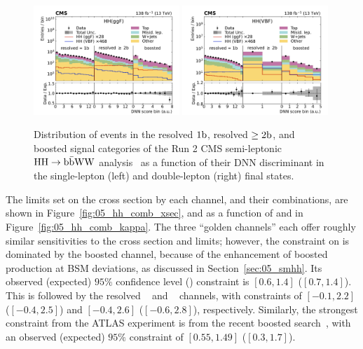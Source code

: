 \begin{figure}[htb!]
    \centering
    \includegraphics[width=0.49\textwidth]{figures/05-HH/CMS-results/bbww/CMS-HIG-21-005_Figure_005-a.pdf}
    \includegraphics[width=0.49\textwidth]{figures/05-HH/CMS-results/bbww/CMS-HIG-21-005_Figure_005-b.pdf}
    \caption[Distribution of events in the resolved $1\Pb$, resolved $\geq2\Pb$, and boosted signal categories of the Run 2 CMS semi-leptonic $\HH\to\bbww$ analysis~\cite{CMS:2024rgy}.]{Distribution of events in the resolved $1\Pb$, resolved $\geq2\Pb$, and boosted signal categories of the Run 2 CMS semi-leptonic $\HH\to\bbww$ analysis~\cite{CMS:2024rgy} as a function of their DNN discriminant in the single-lepton (left) and double-lepton (right) final states.}
    \label{fig:05_bbww}
\end{figure}

The limits set on the \HH cross section by each channel, and their combinations, are shown in Figure~\ref{fig:05_hh_comb_xsec}, and as a function of \kapl and \kapvv in Figure~\ref{fig:05_hh_comb_kappa}.
The three ``golden channels'' each offer roughly similar sensitivities to the cross section and \kapl limits; however, the constraint on \kapvv is dominated by the boosted \bbbb channel, because of the enhancement of boosted \HH production at BSM \kapvv deviations, as discussed in Section~\ref{sec:05_smhh}.
Its observed (expected) $95\%$ confidence level (\CL) constraint is $[0.6, 1.4]$ ($[0.7, 1.4]$).
This is followed by the resolved \bbbb~\cite{CMS:2022cpr} and \bbtautau~\cite{CMS:2022hgz} channels, with constraints of $[-0.1, 2.2]$ ($[-0.4, 2.5]$) and $[-0.4, 2.6]$ ($[-0.6, 2.8]$), respectively.
Similarly, the strongest \kapvv constraint from the ATLAS experiment is from the recent boosted \bbbb search~\cite{ATLAS-CONF-2024-003}, with an observed (expected) $95\%$ \CL constraint of $[0.55, 1.49]$ ($[0.3, 1.7]$).


